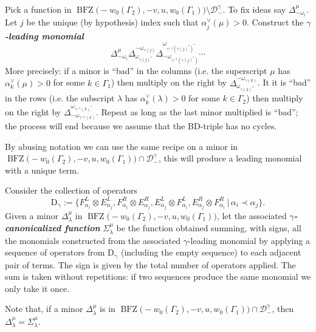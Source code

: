 \documentclass[a4paper]{amsart}
\theoremstyle{definition}
\newcommand{\newword}[1]{\textbf{\emph{#1}}}
\begin{document}
\begin{recipe}
  Pick a function in $\operatorname{BFZ}\big(-w_0(\Gamma_2),-v,u,w_0(\Gamma_1)\big)\setminus \mathcal{D}^\gamma_-$. 
  To fix ideas say $\Delta_{-\omega_i}^\mu$.
  Let $j$ be the unique (by hypothesis) index such that $\alpha_j^\vee(\mu)>0$.
  Construct the \newword{$\gamma$-leading monomial}
  \[
    \Delta_{-\omega_i}^\mu 
    \Delta_{\omega_{\gamma(j)^*}}^{-\omega_{\gamma(j)}}
    \Delta_{-\omega_{\gamma^{-1}(\gamma(j)^*)}}^{\omega_{\gamma^{-1}(\gamma(j)^*)^*}}
    \cdots
  \]
  More precisely: if a minor is ``bad'' in the columns (i.e. the superscript $\mu$ has  $\alpha_k^\vee(\mu)>0$ for some $k\in\Gamma_1$) then multiply on the right by $\Delta_{\omega_{\gamma(k)^*}}^{-\omega_{\gamma(k)}}$.
  It it is ``bad'' in the rows (i.e. the subscript $\lambda$ has  $\alpha_k^\vee(\lambda)>0$ for some $k\in\Gamma_2$) then multiply on the right by $\Delta_{-\omega_{\gamma^{-1}(k)}}^{\omega_{\gamma^{-1}(k)^*}}$.
  Repeat as long as the last minor multiplied is ``bad''; the process will end because we assume that the BD-triple has no cycles.
\end{recipe}

By abusing notation we can use the same recipe on a minor in $\operatorname{BFZ}\big(-w_0(\Gamma_2),-v,u,w_0(\Gamma_1)\big)\cap \mathcal{D}^\gamma_-$, this will produce a leading monomial with a unique term.

\begin{recipe}
  Consider the collection of operators 
  \[
    \operatorname{D_\gamma}:=\Big\{ 
      F_{\alpha_i}^L\otimes E_{\alpha_j}^L, 
      F_{\alpha_i}^R\otimes E_{\alpha_j}^R, 
      E_{\alpha_j}^L\otimes F_{\alpha_i}^L, 
      E_{\alpha_j}^R\otimes F_{\alpha_i}^R
      \,\big|\,\alpha_i\prec\alpha_j
    \Big\}.
  \]
  Given a minor $\Delta_\lambda^\mu$ in $\operatorname{BFZ}\big(-w_0(\Gamma_2),-v,u,w_0(\Gamma_1)\big)$, let the associated \newword{$\gamma$-canonicalized function} $\Sigma_\lambda^\mu$  be the function obtained summing, with signs, all the monomials constructed from the associated $\gamma$-leading monomial by applying a sequence of operators from $\operatorname{D_\gamma}$ (including the empty sequence) to each adjacent pair of terms.
  The sign is given by the total number of operators applied.
  The sum is taken without repetitions: if two sequences produce the same monomial we only take it once.
\end{recipe}

Note that, if a minor $\Delta_\lambda^\mu$ is in $\operatorname{BFZ}\big(-w_0(\Gamma_2),-v,u,w_0(\Gamma_1)\big)\cap \mathcal{D}^\gamma_-$, then $\Delta_\lambda^\mu=\Sigma_\lambda^\mu$.
\end{document}
